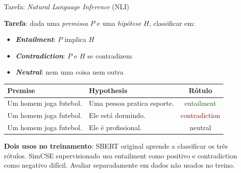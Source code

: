 \documentclass[aspectratio=169, xcolor=dvipsnames]{beamer}
\begin{document}
  \begin{frame}{Tarefa: \textit{Natural Language Inference} (NLI)}
    
    \textbf{Tarefa}: dada uma \textit{premissa} $P$ e uma \textit{hipótese} $H$, classificar em:
    \begin{itemize}
      \item \textbf{\textit{Entailment}}: $P$ implica $H$
      \item \textbf{\textit{Contradiction}}: $P$ e $H$ se contradizem
      \item \textbf{\textit{Neutral}}: nem uma coisa nem outra
    \end{itemize}
    \centering
    \begin{tabular}{llc}
      \toprule
      \textbf{Premise} & \textbf{Hypothesis} & \textbf{Rótulo} \\
      \midrule
      Um homem joga futebol. & Uma pessoa pratica esporte. & \textcolor{DarkGreen}{entailment} \\
      Um homem joga futebol. & Ele está dormindo. & \textcolor{DarkRed}{contradiction} \\
      Um homem joga futebol. & Ele é profissional. & neutral \\
      \bottomrule
    \end{tabular}
    \flushleft
    \vspace{0.3em}
    \textbf{Dois usos no treinamento}: SBERT original aprende a classificar
    os três rótulos. SimCSE supervisionado usa entailment como positivo
    e contradiction como negativo difícil\cite{gao2021simcse}.
    Avaliar separadamente em dados não usados no treino.
  \end{frame}
\end{document}
